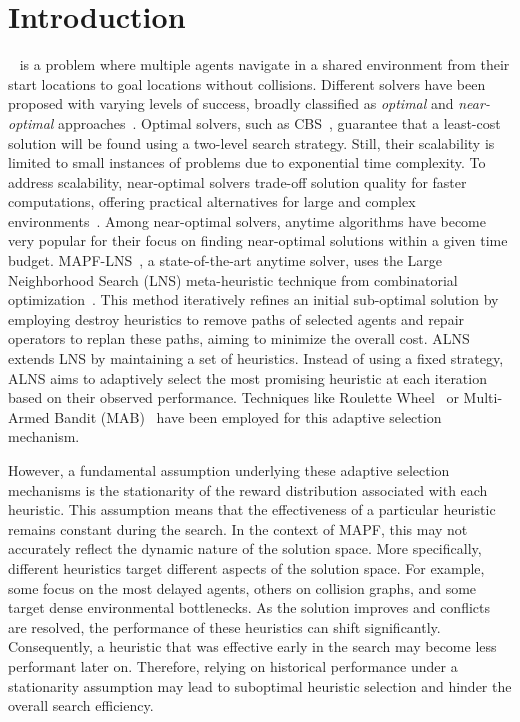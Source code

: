\documentclass[review]{jair}
\begin{document}
\section{Introduction}
~\citep{SternEtal2019} is a problem where multiple agents navigate in a shared environment from their start locations to goal locations without collisions. Different solvers have been proposed with varying levels of success, broadly classified as \emph{optimal} and \emph{near-optimal} approaches~\citep{SBOS}. Optimal solvers, such as CBS~\citep{CBS}, guarantee that a least-cost solution will be found using a two-level search strategy. Still, their scalability is limited to small instances of problems due to exponential time complexity. To address scalability, near-optimal solvers trade-off solution quality for faster computations, offering practical alternatives for large and complex environments~\citep{ECBS, EECBS}.
Among near-optimal solvers, anytime algorithms have become very popular for their focus on finding near-optimal solutions within a given time budget. MAPF-LNS~\citep{LNS}, a state-of-the-art anytime solver, uses the Large Neighborhood Search (LNS) meta-heuristic technique from combinatorial optimization~\citep{ori-LNS, LNS-comb}. This method iteratively refines an initial sub-optimal solution by employing destroy heuristics to remove paths of selected agents and repair operators to replan these paths, aiming to minimize the overall cost. ALNS extends LNS by maintaining a set of heuristics. Instead of using a fixed strategy, ALNS aims to adaptively select the most promising heuristic at each iteration based on their observed performance. Techniques like Roulette Wheel~\citep{LNS} or Multi-Armed Bandit (MAB)~\citep{Balance} have been employed for this adaptive selection mechanism. 

However, a fundamental assumption underlying these adaptive selection mechanisms is the stationarity of the reward distribution associated with each heuristic. This assumption means that the effectiveness of a particular heuristic remains constant during the search. In the context of MAPF, this may not accurately reflect the dynamic nature of the solution space. More specifically, different heuristics target different aspects of the solution space. For example, some focus on the most delayed agents, others on collision graphs, and some target dense environmental bottlenecks. As the solution improves and conflicts are resolved, the performance of these heuristics can shift significantly. Consequently, a heuristic that was effective early in the search may become less performant later on. Therefore, relying on historical performance under a stationarity assumption may lead to suboptimal heuristic selection and hinder the overall search efficiency.
\end{document}
